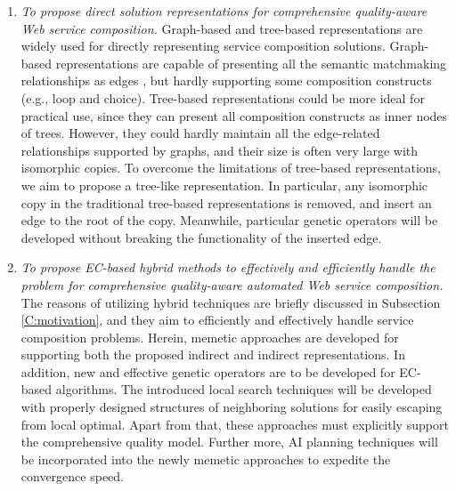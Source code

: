 \begin{enumerate}
\begin{enumerate}
    
    \item \emph{To propose direct solution representations for comprehensive quality-aware Web service composition.} Graph-based and tree-based representations are widely used for directly representing service composition solutions. Graph-based representations are capable of presenting all the semantic matchmaking relationships as edges \cite{lecue2009optimizing,wang2017comprehensive}, but hardly supporting some composition constructs (e.g., loop and choice). Tree-based representations could be more ideal for practical use, since they can present all composition constructs as inner nodes of trees. However, they could hardly maintain all the edge-related relationships supported by graphs, and their size is often very large with isomorphic copies. To overcome the limitations of tree-based representations, we aim to propose a tree-like representation. In particular, any isomorphic copy in the traditional tree-based representations is removed, and insert an edge to the root of the copy. Meanwhile, particular genetic operators will be developed without breaking the functionality of the inserted edge.
        
    \item \emph{To propose EC-based hybrid methods to effectively and efficiently handle the problem for comprehensive quality-aware automated Web service composition.} The reasons of utilizing hybrid techniques are briefly discussed in Subsection \ref{C:motivation}, and they aim to efficiently and effectively handle service composition problems. Herein, memetic approaches are developed for supporting both the proposed indirect and indirect representations. In addition, new and effective genetic operators are to be developed for EC-based algorithms. The introduced local search techniques will be developed with properly designed structures of neighboring solutions for easily escaping from local optimal. Apart from that, these approaches must explicitly support the comprehensive quality model. Further more, AI planning techniques will be incorporated into the newly memetic approaches to expedite the convergence speed.
  \end{enumerate}
 

\end{enumerate}

